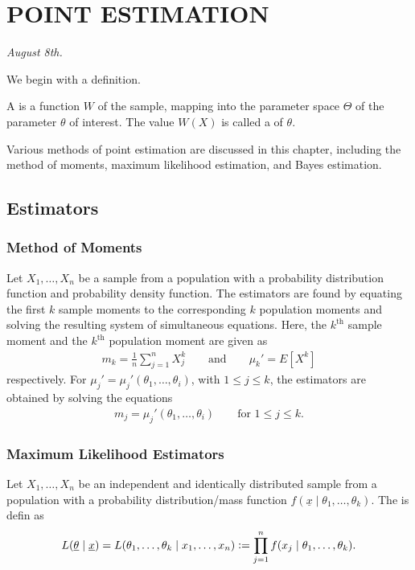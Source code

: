 \chapter{POINT ESTIMATION}
\textit{August 8th.}

We begin with a definition.

\begin{definition}
    A  is a function $W$ of the sample, mapping into the parameter space $\Theta$ of the parameter $\theta$ of interest. The value $W(X)$ is called a  of $\theta$.
\end{definition}

Various methods of point estimation are discussed in this chapter, including the method of moments, maximum likelihood estimation, and Bayes estimation.

\section{Estimators}
\subsection{Method of Moments}
Let $X_{1},\ldots,X_{n}$ be a sample from a population with a probability distribution function and probability density function. The  estimators are found by equating the first $k$ sample moments to the corresponding $k$ population moments and solving the resulting system of simultaneous equations. Here, the $k^{\text{th}}$ sample moment and the $k^{\text{th}}$ population moment are given as
\begin{align}
    m_{k} = \frac{1}{n} \sum_{j=1}^{n} X_{j}^{k} \qquad \text{and} \qquad \mu_{k}' = E[X^{k}]
\end{align}
respectively. For $\mu_{j}' = \mu_{j}'(\theta_{1},\ldots,\theta_{i})$, with $1 \leq j \leq k$, the estimators are obtained by solving the equations
\begin{align}
    m_{j} = \mu_{j}'(\theta_{1},\ldots,\theta_{i}) \qquad \text{for } 1 \leq j \leq k.
\end{align}

\subsection{Maximum Likelihood Estimators}

Let $X_{1},\ldots,X_{n}$ be an independent and identically distributed sample from a population with a probability distribution/mass function $f(\underline{x} \mid \theta_{1},\ldots,\theta_{k})$. The  is defin as
\begin{align}
    L(\underline{\theta} \mid \underline{x}) = L(\theta_{1},\ldots,\theta_{k} \mid x_{1},\ldots,x_{n}) \vcentcolon= \prod_{j=1}^{n} f(x_{j} \mid \theta_{1},\ldots,\theta_{k}).
\end{align}

